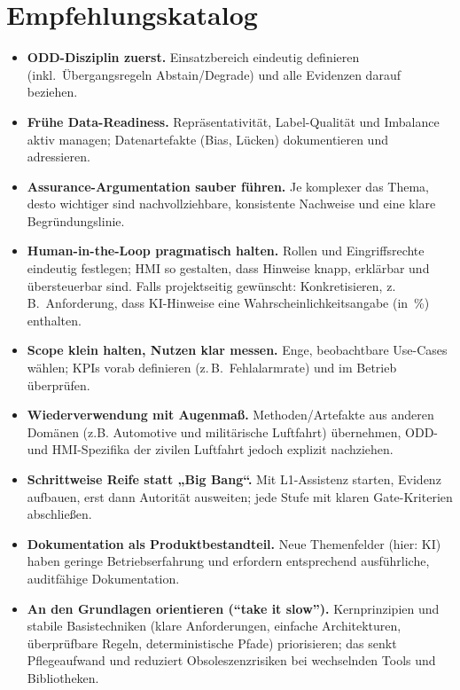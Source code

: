 \section{Empfehlungskatalog}

\begin{itemize}
  \item \textbf{ODD-Disziplin zuerst.}
        Einsatzbereich eindeutig definieren (inkl.\ Übergangsregeln Abstain/Degrade) und alle Evidenzen darauf beziehen.

  \item \textbf{Frühe Data-Readiness.}
        Repräsentativität, Label-Qualität und Imbalance aktiv managen; Datenartefakte (Bias, Lücken) dokumentieren und adressieren.

  \item \textbf{Assurance-Argumentation sauber führen.}
        Je komplexer das Thema, desto wichtiger sind nachvollziehbare, konsistente Nachweise und eine klare Begründungslinie.

  \item \textbf{Human-in-the-Loop pragmatisch halten.}
        Rollen und Eingriffsrechte eindeutig festlegen; HMI so gestalten, dass Hinweise knapp, erklärbar und übersteuerbar sind.
        Falls projektseitig gewünscht: Konkretisieren, z.\,B.\ Anforderung, dass KI-Hinweise eine Wahrscheinlichkeitsangabe (in~\%) enthalten.

  \item \textbf{Scope klein halten, Nutzen klar messen.}
        Enge, beobachtbare Use-Cases wählen; KPIs vorab definieren (z.\,B.\ Fehlalarmrate) und im Betrieb überprüfen.

  \item \textbf{Wiederverwendung mit Augenmaß.}
        Methoden/Artefakte aus anderen Domänen (z.B. Automotive und militärische Luftfahrt) übernehmen, ODD- und HMI-Spezifika der zivilen Luftfahrt jedoch explizit nachziehen.

  \item \textbf{Schrittweise Reife statt „Big Bang“.}
        Mit L1-Assistenz starten, Evidenz aufbauen, erst dann Autorität ausweiten; jede Stufe mit klaren Gate-Kriterien abschließen.

  \item \textbf{Dokumentation als Produktbestandteil.}
        Neue Themenfelder (hier: KI) haben geringe Betriebserfahrung und erfordern entsprechend ausführliche, auditfähige Dokumentation.

  \item \textbf{An den Grundlagen orientieren (``take it slow'').}
      Kernprinzipien und stabile Basistechniken (klare Anforderungen, einfache Architekturen, überprüfbare Regeln, deterministische Pfade) priorisieren; das senkt Pflegeaufwand und reduziert Obsoleszenzrisiken bei wechselnden Tools und Bibliotheken.

\end{itemize}

